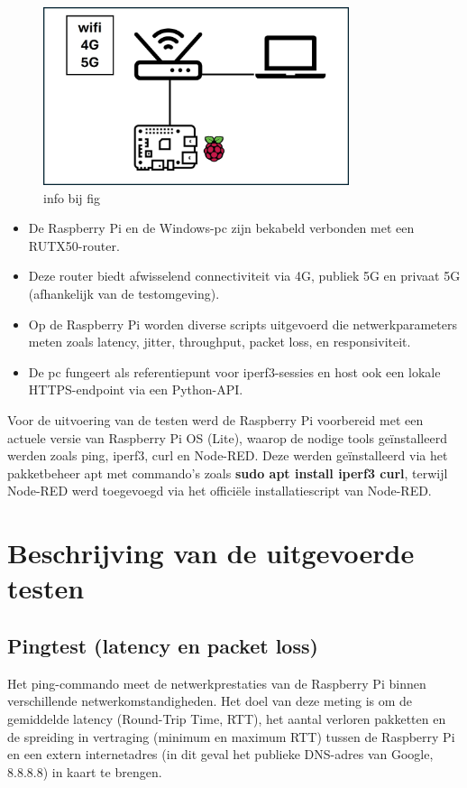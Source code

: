 \begin{figure}
    
    \includegraphics[width=0.8\textwidth]{../graphics/Opstelling_1.jpg}
    \caption[opstelling 1]{\label{fig:opstellingpi}info bij fig}
\end{figure}
\begin{itemize}
    \item De Raspberry Pi en de Windows-pc zijn bekabeld verbonden met een RUTX50-router.
    \item Deze router biedt afwisselend connectiviteit via 4G, publiek 5G en privaat 5G (afhankelijk van de testomgeving).
    \item Op de Raspberry Pi worden diverse scripts uitgevoerd die netwerkparameters meten zoals latency, jitter, throughput, packet loss, en responsiviteit.
    \item De pc fungeert als referentiepunt voor iperf3-sessies en host ook een lokale HTTPS-endpoint via een Python-API.
\end{itemize}

Voor de uitvoering van de testen werd de Raspberry Pi voorbereid met een actuele versie van Raspberry Pi OS (Lite), waarop de nodige tools geïnstalleerd werden zoals ping, iperf3, curl en Node-RED. Deze werden geïnstalleerd via het pakketbeheer apt met commando’s zoals \textbf{sudo apt install iperf3 curl}, terwijl Node-RED werd toegevoegd via het officiële installatie­script van Node-RED.

\section{Beschrijving van de uitgevoerde testen}

\subsection{Pingtest (latency en packet loss)}
Het ping-commando meet de netwerkprestaties van de Raspberry Pi binnen verschillende netwerkomstandigheden. Het doel van deze meting is om de gemiddelde latency (Round-Trip Time, RTT), het aantal verloren pakketten en de spreiding in vertraging (minimum en maximum RTT) tussen de Raspberry Pi en een extern internetadres (in dit geval het publieke DNS-adres van Google, 8.8.8.8) in kaart te brengen.

